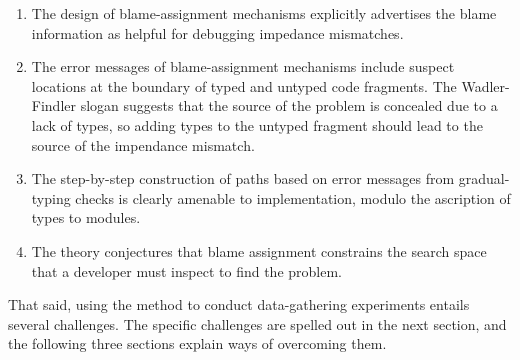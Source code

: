 \begin{enumerate}

\item The design of blame-assignment mechanisms explicitly advertises the blame
information as helpful for debugging impedance mismatches.

\item The error messages of blame-assignment mechanisms include suspect
locations at the boundary of typed and untyped code fragments.
The Wadler-Findler slogan suggests that the source of the problem is concealed due to a lack of types, so
adding types to the untyped fragment should lead to the source of the impendance mismatch.

\item The step-by-step construction of paths based on error messages from
gradual-typing checks is clearly amenable to implementation, modulo the
ascription of types to modules.

\item The theory conjectures that blame assignment constrains the search
space that a developer must inspect to find the problem.

\end{enumerate}

That said, using the method to conduct data-gathering experiments entails
several challenges. The specific challenges are spelled out in the next section,
and the following three sections explain ways of overcoming them.




